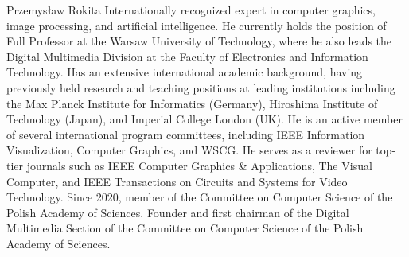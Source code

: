 \documentclass[journal,twoside,web]{ieeecolor}
\begin{document}
\begin{IEEEbiographynophoto}{Przemysław Rokita}
    Internationally recognized expert in computer graphics, image processing, and artificial intelligence. He currently holds the position of Full Professor at the Warsaw University of Technology, where he also leads the Digital Multimedia Division at the Faculty of Electronics and Information Technology. Has an extensive international academic background, having previously held research and teaching positions at leading institutions including the Max Planck Institute for Informatics (Germany), Hiroshima Institute of Technology (Japan), and Imperial College London (UK). He is an active member of several international program committees, including IEEE Information Visualization, Computer Graphics, and WSCG. He serves as a reviewer for top-tier journals such as IEEE Computer Graphics \& Applications, The Visual Computer, and IEEE Transactions on Circuits and Systems for Video Technology. Since 2020, member of the Committee on Computer Science of the Polish Academy of Sciences. Founder and first chairman of the Digital Multimedia Section of the Committee on Computer Science of the Polish Academy of Sciences.
\end{IEEEbiographynophoto}
\end{document}
